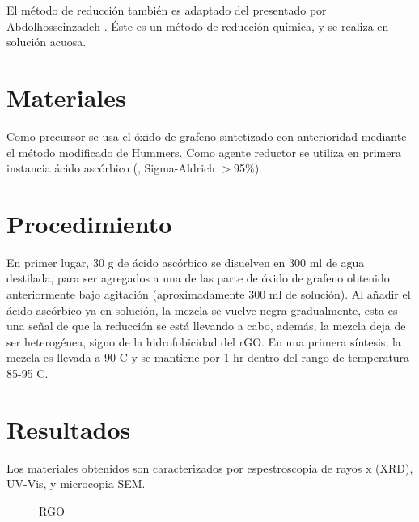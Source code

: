 El método de reducción también es adaptado del presentado por Abdolhosseinzadeh \citep{Abdolhosseinzadeh2015}. Éste es un método de reducción química, y se realiza en solución acuosa.

\section{Materiales}
Como precursor se usa el óxido de grafeno sintetizado con anterioridad mediante el método modificado de Hummers. Como agente reductor se utiliza en primera instancia ácido ascórbico (, Sigma-Aldrich $>$95\%).

\section{Procedimiento}
En primer lugar, 30 g de ácido ascórbico se disuelven en 300 ml de agua destilada, para ser agregados a una de las parte de óxido de grafeno obtenido anteriormente bajo agitación (aproximadamente 300 ml de solución). Al añadir el ácido ascórbico ya en solución, la mezcla se vuelve negra gradualmente, esta es una señal de que la reducción se está llevando a cabo, además, la mezcla deja de ser heterogénea, signo de la hidrofobicidad del rGO. En una primera síntesis, la mezcla es llevada a 90 \degree C y se mantiene por 1 hr dentro del rango de temperatura 85-95 \degree C.

\section{Resultados}
Los materiales obtenidos son caracterizados por espestroscopia de rayos x (XRD), UV-Vis, y microcopia SEM.

\begin{figure}
	\centering
	\caption{RGO}
	\label{fig:RGO}
\end{figure}

